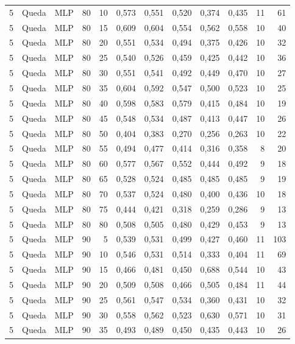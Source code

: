 \begin{longtable}{@{}rllrrrrrrrrr@{}}
5 & Queda & MLP & 80 & 10 & 0,573 & 0,551 & 0,520 & 0,374 & 0,435 & 11 & 61 \\
5 & Queda & MLP & 80 & 15 & 0,609 & 0,604 & 0,554 & 0,562 & 0,558 & 10 & 40 \\
5 & Queda & MLP & 80 & 20 & 0,551 & 0,534 & 0,494 & 0,375 & 0,426 & 10 & 32 \\
5 & Queda & MLP & 80 & 25 & 0,540 & 0,526 & 0,459 & 0,425 & 0,442 & 10 & 36 \\
5 & Queda & MLP & 80 & 30 & 0,551 & 0,541 & 0,492 & 0,449 & 0,470 & 10 & 27 \\
5 & Queda & MLP & 80 & 35 & 0,604 & 0,592 & 0,547 & 0,500 & 0,523 & 10 & 25 \\
5 & Queda & MLP & 80 & 40 & 0,598 & 0,583 & 0,579 & 0,415 & 0,484 & 10 & 19 \\
5 & Queda & MLP & 80 & 45 & 0,548 & 0,534 & 0,487 & 0,413 & 0,447 & 10 & 26 \\
5 & Queda & MLP & 80 & 50 & 0,404 & 0,383 & 0,270 & 0,256 & 0,263 & 10 & 22 \\
5 & Queda & MLP & 80 & 55 & 0,494 & 0,477 & 0,414 & 0,316 & 0,358 & 8 & 20 \\
5 & Queda & MLP & 80 & 60 & 0,577 & 0,567 & 0,552 & 0,444 & 0,492 & 9 & 18 \\
5 & Queda & MLP & 80 & 65 & 0,528 & 0,524 & 0,485 & 0,485 & 0,485 & 9 & 19 \\
5 & Queda & MLP & 80 & 70 & 0,537 & 0,524 & 0,480 & 0,400 & 0,436 & 10 & 18 \\
5 & Queda & MLP & 80 & 75 & 0,444 & 0,421 & 0,318 & 0,259 & 0,286 & 9 & 13 \\
5 & Queda & MLP & 80 & 80 & 0,508 & 0,505 & 0,480 & 0,429 & 0,453 & 9 & 13 \\
5 & Queda & MLP & 90 & 5 & 0,539 & 0,531 & 0,499 & 0,427 & 0,460 & 11 & 103 \\
5 & Queda & MLP & 90 & 10 & 0,546 & 0,531 & 0,514 & 0,333 & 0,404 & 11 & 69 \\
5 & Queda & MLP & 90 & 15 & 0,466 & 0,481 & 0,450 & 0,688 & 0,544 & 10 & 43 \\
5 & Queda & MLP & 90 & 20 & 0,509 & 0,508 & 0,466 & 0,505 & 0,484 & 11 & 44 \\
5 & Queda & MLP & 90 & 25 & 0,561 & 0,547 & 0,534 & 0,360 & 0,431 & 10 & 32 \\
5 & Queda & MLP & 90 & 30 & 0,558 & 0,562 & 0,523 & 0,630 & 0,571 & 10 & 31 \\
5 & Queda & MLP & 90 & 35 & 0,493 & 0,489 & 0,450 & 0,435 & 0,443 & 10 & 26 \\

\end{longtable}

